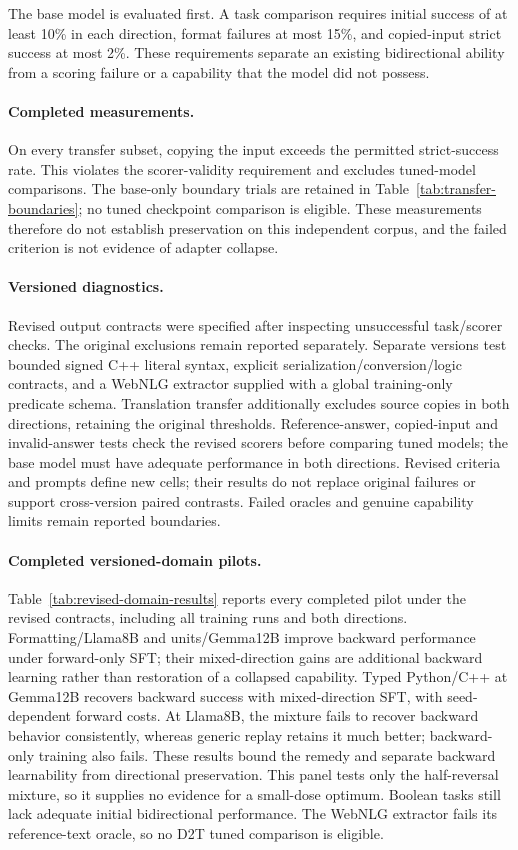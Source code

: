 The base model is evaluated first. A task comparison requires initial success of at least
10\% in each direction, format failures at most 15\%, and copied-input strict success at
most 2\%. These requirements separate an existing bidirectional ability from a scoring
failure or a capability that the model did not possess.
\paragraph{Completed measurements.}
On every transfer subset, copying the input exceeds the permitted strict-success rate.
This violates the scorer-validity requirement and excludes tuned-model comparisons.
The base-only boundary trials are retained in Table~\ref{tab:transfer-boundaries}; no tuned
checkpoint comparison is eligible. These measurements therefore do not establish preservation
on this independent corpus, and the failed criterion is not evidence of adapter collapse.

\paragraph{Versioned diagnostics.}
Revised output contracts were specified after inspecting unsuccessful task/scorer
checks. The original exclusions remain reported separately. Separate versions test bounded signed C++ literal
syntax, explicit serialization/conversion/logic contracts, and a WebNLG extractor supplied
with a global training-only predicate schema. Translation transfer additionally excludes
source copies in both directions, retaining the original thresholds. Reference-answer, copied-input and invalid-answer tests check the revised scorers before
comparing tuned models; the base model must have adequate performance in both directions. Revised criteria and prompts define
new cells; their results do not replace original failures or support cross-version paired
contrasts. Failed oracles and genuine capability limits remain reported boundaries.

\paragraph{Completed versioned-domain pilots.}
Table~\ref{tab:revised-domain-results} reports every completed pilot under the revised
contracts, including all training runs and both directions. Formatting/Llama8B and
units/Gemma12B improve backward performance under forward-only SFT; their mixed-direction
gains are additional backward learning rather than restoration of a collapsed capability.
Typed Python/C++ at Gemma12B recovers backward success with mixed-direction SFT, with
seed-dependent forward costs. At Llama8B, the mixture fails to recover backward behavior
consistently, whereas generic replay retains it much better; backward-only training also
fails. These results bound the remedy and separate backward learnability from directional
preservation. This panel tests only the half-reversal mixture, so it supplies
no evidence for a small-dose optimum. Boolean tasks still lack adequate initial bidirectional performance. The WebNLG
extractor fails its reference-text oracle, so no D2T tuned comparison is eligible.


